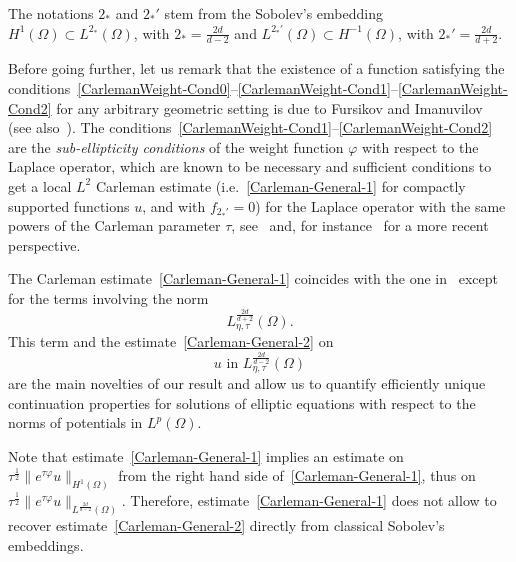 \documentclass[AHL,Unicode,longabstracts]{cedram}
\begin{document}
\begin{rema}
The notations $2_*$ and $2_*'$ stem from the Sobolev's embedding $H^1(\Omega) \subset L^{2_*}(\Omega)$, with $2_* = \frac{2d}{d-2}$ and $L^{2_*'}(\Omega) \subset H^{-1}(\Omega)$, with $2_*' = \frac{2d}{d+2}$.
\end{rema}


Before going further, let us remark that the existence of a function satisfying the conditions~\eqref{CarlemanWeight-Cond0}--\eqref{CarlemanWeight-Cond1}--\eqref{CarlemanWeight-Cond2} for any arbitrary geometric setting is due to Fursikov and Imanuvilov~\cite[Lemma~1.1]{Fursikov1996-book} (see also~\cite[Proposition~3.31]{LeRousseaubookvolume1}). The conditions~\eqref{CarlemanWeight-Cond1}--\eqref{CarlemanWeight-Cond2} are the \emph{sub-ellipticity conditions} of the weight function $\varphi$ with respect to the Laplace operator, which are known to be necessary and sufficient conditions to get a local $L^2$ Carleman estimate (i.e.~\eqref{Carleman-General-1} for compactly supported functions $u$, and with $f_{2_*'} = 0$) for the Laplace operator with the same powers of the Carleman parameter $\tau$, see~\cite[Chapter~XXVIII]{hormanderanalysis4} and, for instance~\cite[Definition~3.2, Section~3.6 and Section~4.1.2]{LeRousseaubookvolume1} for a more recent perspective.


The Carleman estimate~\eqref{Carleman-General-1} coincides with the one in~\cite{imanuvilov2003global} except for the terms involving the norm
\[
L^{\frac{2d}{d+2}}_{\eta,\tau}(\Omega).
\]
This term and the estimate~\eqref{Carleman-General-2} on
\[
u \text{ in }L^{\frac{2d}{d-2}}_{\eta,\tau}(\Omega)
\]
are the main novelties of our result and allow us to quantify efficiently unique continuation properties for solutions of elliptic equations with respect to the norms of potentials in $L^p(\Omega)$.

Note that estimate~\eqref{Carleman-General-1} implies an estimate on $\tau^{\frac{1}{2}} \| e^{\tau \varphi} u\|_{H^1(\Omega)}$ from the right hand side of~\eqref{Carleman-General-1}, thus on $\tau^{\frac{1}{2}} \|e^{\tau \varphi} u\|_{L^{\frac{2d}{d-2}}(\Omega)}$. Therefore, estimate~\eqref{Carleman-General-1} does not allow to recover estimate~\eqref{Carleman-General-2} directly from classical Sobolev's embeddings.
\end{document}

